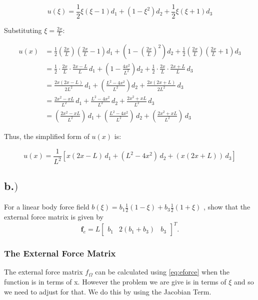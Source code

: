 \documentclass{article}
\begin{document}
\begin{equation}
    u(\xi) = \frac{1}{2} \xi (\xi - 1) d_1 + (1 - \xi^2) d_2 + \frac{1}{2} \xi (\xi + 1) d_3
\end{equation}

Substituting \( \xi = \frac{2x}{L} \):

\begin{align*}
    u(x) &= \frac{1}{2} \left( \frac{2x}{L} \right) \left( \frac{2x}{L} - 1 \right) d_1 + \left( 1 - \left( \frac{2x}{L} \right)^2 \right) d_2 + \frac{1}{2} \left( \frac{2x}{L} \right) \left( \frac{2x}{L} + 1 \right) d_3 \\
    &= \frac{1}{2} \cdot \frac{2x}{L} \cdot \frac{2x - L}{L} \, d_1 + \left( 1 - \frac{4x^2}{L^2} \right) d_2 + \frac{1}{2} \cdot \frac{2x}{L} \cdot \frac{2x + L}{L} \, d_3 \\
    &= \frac{2x (2x - L)}{2L^2} \, d_1 + \left( \frac{L^2 - 4x^2}{L^2} \right) d_2 + \frac{2x (2x + L)}{2L^2} \, d_3 \\
    &= \frac{2x^2 - xL}{L^2} \, d_1 + \frac{L^2 - 4x^2}{L^2} \, d_2 + \frac{2x^2 + xL}{L^2} \, d_3\\
    &=  \left(\frac{2x^2 - xL}{L^2} \right) \, d_1 + \left( \frac{L^2 - 4x^2}{L^2} \right) \, d_2 + \left( \frac{2x^2 + xL}{L^2} \right) \, d_3
\end{align*}

Thus, the simplified form of \( u(x) \) is:

\begin{equation*}
    u(x) = \frac{1}{L^2}\left[ x(2x-L)  \, d_1 + \left( L^{2}-4x^2 \right) \, d_2 + \left( x(2x+L) \right) \, d_3 \right]
\end{equation*}




\newpage
\subsection*{ b.$)$}

For a linear body force field $ b(\xi) = b_1 \frac{1}{2}(1 - \xi) + b_3 \frac{1}{2}(1 + \xi)$ , show that the external force matrix is given by 
\[
\mathbf{f}_e = L \begin{bmatrix} b_1 & 2(b_1 + b_3) & b_3 \end{bmatrix}^T.
\]


\subsubsection*{The External Force Matrix}
The external force matrix $f_{\Omega}$ can be calculated using \ref{eq:eforce} when the function is in terms of x.
However the problem we are give is in terms of $\xi$ and so we need to adjust for that. We do this by using the Jacobian Term.
\end{document}

